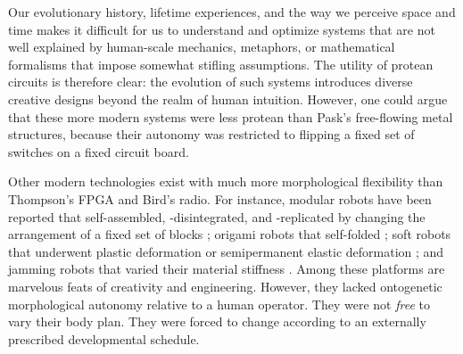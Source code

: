 Our evolutionary history, 
lifetime experiences, 
and the way we perceive space and time
makes it difficult for us to understand 
and optimize systems that are not well explained by 
human-scale mechanics,
metaphors,
or mathematical formalisms that impose somewhat stifling assumptions.
The utility of protean circuits is therefore clear: the evolution of such systems introduces diverse creative designs beyond the realm of human intuition.
However, one could argue that these more modern systems were less protean than Pask's free-flowing metal structures,
because their autonomy was restricted to flipping a fixed set of switches on a fixed circuit board.


Other modern technologies exist with much more 
morphological
flexibility
than Thompson's FPGA and Bird's radio.
For instance,
modular robots have been reported that self-assembled, -disintegrated, and -replicated by changing the arrangement of a fixed set of blocks \cite{zykov2005robotics,romanishin20153d,li2019particle,white2005three};
origami robots that self-folded
\cite{hawkes2010programmable,felton2014method,miyashita2017robotic,gladman2016biomimetic,kotikian2019untethered};
soft robots that underwent plastic deformation or semipermanent elastic deformation
\cite{shepherd2011multigait,shah2019morphing,shah2020gaining};
and jamming robots that varied their material stiffness \cite{brown2010universal,narang2018transforming,steltz2009jsel}.
Among these platforms are marvelous feats of creativity and engineering.
However, they lacked ontogenetic morphological autonomy relative to a human operator.
They were not \textit{free} to vary their body plan.
They were forced to change according to an externally prescribed developmental schedule.




